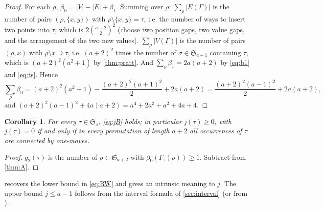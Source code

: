 \documentclass[11pt,reqno]{amsart}
\theoremstyle{plain}
\newtheorem{corollary}[corollary]{Corollary}
\theoremstyle{definition}
\theoremstyle{remark}
\newcommand{\Sym}{\mathfrak{S}}
\newcommand{\Gam}{\Gamma}
\newcommand{\bz}{\beta_0}
\newcommand{\bone}{\beta_1}
\begin{document}
\begin{proof}
For each $\rho$, $\bz=|V|-|E|+\bone$. Summing over $\rho$: $\sum_\rho|E(\Gam)|$ is the number of pairs $(\rho,\{x,y\})$ with $\rho\setminus\{x,y\}=\tau$, i.e. the number of ways to insert two points into $\tau$, which is $2\binom{a+2}2^2$ (choose two position gaps, two value gaps, and the arrangement of the two new values). $\sum_\rho|V(\Gam)|$ is the number of pairs $(\rho,x)$ with $\rho\setminus x\supseteq\tau$, i.e. $(a+2)^2$ times the number of $\sigma\in\Sym_{a+1}$ containing $\tau$, which is $(a+2)^2(a^2+1)$ by \cref{thm:pratt}. And $\sum_\rho\bone=2a(a+2)$ by \eqref{eq:b1} and \eqref{eq:ts}. Hence
\[
\sum_\rho\bz=(a+2)^2(a^2+1)-\frac{(a+2)^2(a+1)^2}{2}+2a(a+2)=\frac{(a+2)^2(a-1)^2}{2}+2a(a+2),
\]
and $(a+2)^2(a-1)^2+4a(a+2)=a^4+2a^3+a^2+4a+4$.
\end{proof}

\begin{corollary}\label{cor:j}
For every $\tau\in\Sym_a$, \eqref{eq:jB} holds; in particular $j(\tau)\ge0$, with $j(\tau)=0$ if and only if in every permutation of length $a+2$ all occurrences of $\tau$ are connected by one-moves.
\end{corollary}

\begin{proof}
$g_2(\tau)$ is the number of $\rho\in\Sym_{a+2}$ with $\bz(\Gam_\tau(\rho))\ge1$. Subtract from \cref{thm:A}.
\end{proof}

 recovers the lower bound in \eqref{eq:RW} and gives an intrinsic meaning to $j$. The upper bound $j\le a-1$ follows from the interval formula of \cref{sec:interval} (or from \cite{RayWest2003}).
\end{document}
